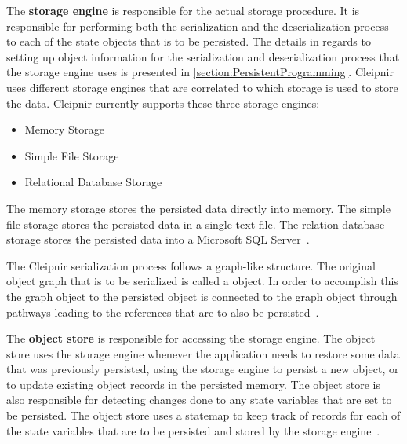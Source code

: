 The \textbf{storage engine} is responsible for the actual storage procedure. It is responsible for performing both the serialization and the deserialization process to each of the state objects that is to be persisted. The details in regards to setting up object information for the serialization and deserialization process that the storage engine uses is presented in \autoref{section:PersistentProgramming}. Cleipnir uses different storage engines that are correlated to which storage is used to store the data. Cleipnir currently supports these three storage engines:
\begin{itemize}
	\item{Memory Storage}
	\item{Simple File Storage}
	\item{Relational Database Storage}
\end{itemize}
\cites[p.~10,12]{PAPER:PaxosCleipnir}

The memory storage stores the persisted data directly into memory.
The simple file storage stores the persisted data in a single text file.
The relation database storage stores the persisted data into a Microsoft SQL Server~\cite{WEB:MSSQL}.

The Cleipnir serialization process follows a graph-like structure. The original object graph that is to be serialized is called a  object. In order to accomplish this the  graph object to the persisted object is connected to the graph object through pathways leading to the references that are to also be persisted~\cite[p.~10]{PAPER:PaxosCleipnir}.


The \textbf{object store} is responsible for accessing the storage engine. The object store uses the storage engine whenever the application needs to restore some data that was previously persisted, using the storage engine to persist a new object, or to update existing object records in the persisted memory. The object store is also responsible for detecting changes done to any state variables that are set to be persisted.
The object store uses a statemap to keep track of records for each of the state variables that are to be persisted and stored by the storage engine~\cite[p.~11]{PAPER:PaxosCleipnir}.

